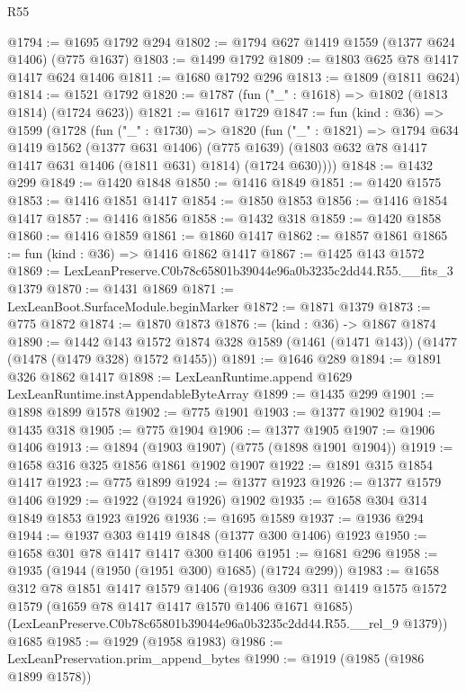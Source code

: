 \begin{lexlean}{R55}
\begin{coremodule}
{{@1794 := @1695 @1792 @294
@1802 := @1794 @627 @1419 @1559 (@1377 @624 @1406) (@775 @1637)
@1803 := @1499 @1792
@1809 := @1803 @625 @78 @1417 @1417 @624 @1406
@1811 := @1680 @1792 @296
@1813 := @1809 (@1811 @624)
@1814 := @1521 @1792
@1820 := @1787 (fun ("_" : @1618) => @1802 (@1813 @1814) (@1724 @623))
@1821 := @1617 @1729
@1847 := fun (kind : @36) =>
  @1599
    (@1728
      (fun ("_" : @1730) =>
      @1820
        (fun ("_" : @1821) =>
        @1794
          @634
          @1419
          @1562
          (@1377 @631 @1406)
          (@775 @1639)
          (@1803 @632 @78 @1417 @1417 @631 @1406 (@1811 @631) @1814)
          (@1724 @630))))
@1848 := @1432 @299
@1849 := @1420 @1848
@1850 := @1416 @1849
@1851 := @1420 @1575
@1853 := @1416 @1851 @1417
@1854 := @1850 @1853
@1856 := @1416 @1854 @1417
@1857 := @1416 @1856
@1858 := @1432 @318
@1859 := @1420 @1858
@1860 := @1416 @1859
@1861 := @1860 @1417
@1862 := @1857 @1861
@1865 := fun (kind : @36) => @1416 @1862 @1417
@1867 := @1425 @143 @1572
@1869 := LexLeanPreserve.C0b78c65801b39044e96a0b3235c2dd44.R55.__fits_3 @1379
@1870 := @1431 @1869
@1871 := LexLeanBoot.SurfaceModule.beginMarker
@1872 := @1871 @1379
@1873 := @775 @1872
@1874 := @1870 @1873
@1876 := (kind : @36) -> @1867 @1874
@1890 := @1442
    @143
    @1572
    @1874
    @328
    @1589
    (@1461 (@1471 @143))
    (@1477 (@1478 (@1479 @328) @1572 @1455))
@1891 := @1646 @289
@1894 := @1891 @326 @1862 @1417
@1898 := LexLeanRuntime.append @1629 LexLeanRuntime.instAppendableByteArray
@1899 := @1435 @299
@1901 := @1898 @1899 @1578
@1902 := @775 @1901
@1903 := @1377 @1902
@1904 := @1435 @318
@1905 := @775 @1904
@1906 := @1377 @1905
@1907 := @1906 @1406
@1913 := @1894 (@1903 @1907) (@775 (@1898 @1901 @1904))
@1919 := @1658 @316 @325 @1856 @1861 @1902 @1907
@1922 := @1891 @315 @1854 @1417
@1923 := @775 @1899
@1924 := @1377 @1923
@1926 := @1377 @1579 @1406
@1929 := @1922 (@1924 @1926) @1902
@1935 := @1658 @304 @314 @1849 @1853 @1923 @1926
@1936 := @1695 @1589
@1937 := @1936 @294
@1944 := @1937 @303 @1419 @1848 (@1377 @300 @1406) @1923
@1950 := @1658 @301 @78 @1417 @1417 @300 @1406
@1951 := @1681 @296
@1958 := @1935 (@1944 (@1950 (@1951 @300) @1685) (@1724 @299))
@1983 := @1658
    @312
    @78
    @1851
    @1417
    @1579
    @1406
    (@1936
      @309
      @311
      @1419
      @1575
      @1572
      @1579
      (@1659 @78 @1417 @1417 @1570 @1406 @1671 @1685)
      (LexLeanPreserve.C0b78c65801b39044e96a0b3235c2dd44.R55.__rel_9 @1379))
    @1685
@1985 := @1929 (@1958 @1983)
@1986 := LexLeanPreservation.prim_append_bytes
@1990 := @1919 (@1985 (@1986 @1899 @1578))
}}
\end{coremodule}
\end{lexlean}
